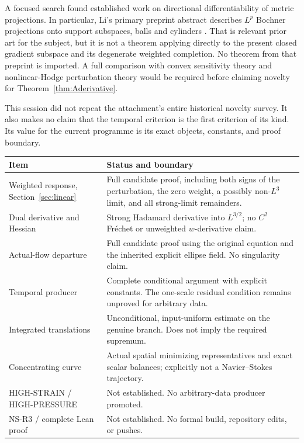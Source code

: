 \documentclass[11pt,a4paper]{article}
\theoremstyle{definition}\newtheorem{definition}[theorem]{Definition}
\theoremstyle{remark}\newtheorem{remark}[theorem]{Remark}
\numberwithin{equation}{section}
\begin{document}
A focused search found established work on directional differentiability of metric projections. In particular, Li's primary preprint abstract describes $L^p$ Bochner projections onto support subspaces, balls and cylinders \cite{Li}. That is relevant prior art for the subject, but it is not a theorem applying directly to the present closed gradient subspace and its degenerate weighted completion. No theorem from that preprint is imported. A full comparison with convex sensitivity theory and nonlinear-Hodge perturbation theory would be required before claiming novelty for Theorem~\ref{thm:Aderivative}.

This session did not repeat the attachment's entire historical novelty survey. It also makes no claim that the temporal criterion is the first criterion of its kind. Its value for the current programme is its exact objects, constants, and proof boundary.

\begin{center}\small\begin{tabular}{@{}p{49mm}p{106mm}@{}}\toprule
Item & Status and boundary\\\midrule
Weighted response, Section~\ref{sec:linear} & Full candidate proof, including both signs of the perturbation, the zero weight, a possibly non-$L^3$ limit, and all strong-limit remainders.\\[3pt]
Dual derivative and Hessian & Strong Hadamard derivative into $L^{3/2}$; no $C^2$ Fr\'echet or unweighted $w$-derivative claim.\\[3pt]
Actual-flow departure & Full candidate proof using the original equation and the inherited explicit ellipse field. No singularity claim.\\[3pt]
Temporal producer & Complete conditional argument with explicit constants. The one-scale residual condition remains unproved for arbitrary data.\\[3pt]
Integrated translations & Unconditional, input-uniform estimate on the genuine branch. Does not imply the required supremum.\\[3pt]
Concentrating curve & Actual spatial minimizing representatives and exact scalar balances; explicitly not a Navier--Stokes trajectory.\\[3pt]
HIGH-STRAIN / HIGH-PRESSURE & Not established. No arbitrary-data producer promoted.\\[3pt]
NS-R3 / complete Lean proof & Not established. No formal build, repository edits, or pushes.\\\bottomrule
\end{tabular}\end{center}
\end{document}
